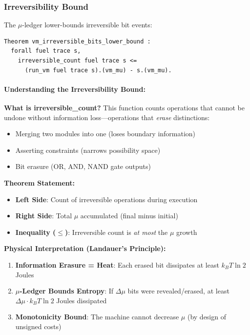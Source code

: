 \subsubsection{Irreversibility Bound}

The $\mu$-ledger lower-bounds irreversible bit events:
\begin{lstlisting}
Theorem vm_irreversible_bits_lower_bound :
  forall fuel trace s,
    irreversible_count fuel trace s <=
      (run_vm fuel trace s).(vm_mu) - s.(vm_mu).
\end{lstlisting}

\paragraph{Understanding the Irreversibility Bound:}
\textbf{What is irreversible\_count?} This function counts operations that cannot be undone without information loss—operations that \emph{erase} distinctions:
\begin{itemize}
    \item Merging two modules into one (loses boundary information)
    \item Asserting constraints (narrows possibility space)
    \item Bit erasure (OR, AND, NAND gate outputs)
\end{itemize}

\textbf{Theorem Statement:}
\begin{itemize}
    \item \textbf{Left Side}: Count of irreversible operations during execution
    \item \textbf{Right Side}: Total $\mu$ accumulated (final minus initial)
    \item \textbf{Inequality ($\leq$)}: Irreversible count is \emph{at most} the $\mu$ growth
\end{itemize}

\textbf{Physical Interpretation (Landauer's Principle):}
\begin{enumerate}
    \item \textbf{Information Erasure = Heat}: Each erased bit dissipates at least $k_B T \ln 2$ Joules
    \item \textbf{$\mu$-Ledger Bounds Entropy}: If $\Delta\mu$ bits were revealed/erased, at least $\Delta\mu \cdot k_B T \ln 2$ Joules dissipated
    \item \textbf{Monotonicity Bound}: The machine cannot decrease $\mu$ (by design of unsigned costs)
\end{enumerate}

